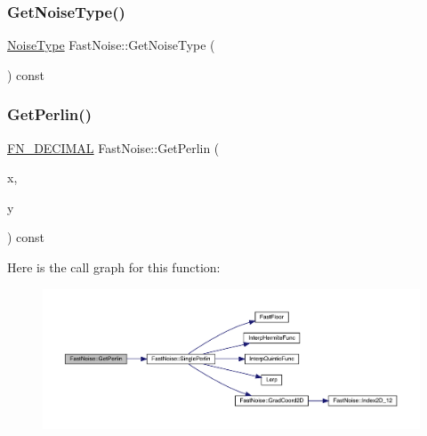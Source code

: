 \subsubsection{\texorpdfstring{Get\+Noise\+Type()}{GetNoiseType()}}
{\footnotesize\ttfamily \mbox{\hyperlink{class_fast_noise_a77adcfdc4d6e9410ef6099553509d09f}{Noise\+Type}} Fast\+Noise\+::\+Get\+Noise\+Type (\begin{DoxyParamCaption}{ }\end{DoxyParamCaption}) const\hspace{0.3cm}{\ttfamily [inline]}}

\mbox{\label{class_fast_noise_aa511d58e188f47cf4fd7fa83164e7a0b}} 
\subsubsection{\texorpdfstring{Get\+Perlin()}{GetPerlin()}\hspace{0.1cm}{\footnotesize\ttfamily [1/2]}}
{\footnotesize\ttfamily \mbox{\hyperlink{_fast_noise_8h_a75a9ef6d2541c4921815b885bfd449c3}{F\+N\+\_\+\+D\+E\+C\+I\+M\+AL}} Fast\+Noise\+::\+Get\+Perlin (\begin{DoxyParamCaption}\item[{\mbox{\hyperlink{_fast_noise_8h_a75a9ef6d2541c4921815b885bfd449c3}{F\+N\+\_\+\+D\+E\+C\+I\+M\+AL}}}]{x,  }\item[{\mbox{\hyperlink{_fast_noise_8h_a75a9ef6d2541c4921815b885bfd449c3}{F\+N\+\_\+\+D\+E\+C\+I\+M\+AL}}}]{y }\end{DoxyParamCaption}) const}

Here is the call graph for this function\+:
\nopagebreak
\begin{figure}[H]
\begin{center}
\leavevmode
\includegraphics[width=350pt]{d1/dd8/class_fast_noise_aa511d58e188f47cf4fd7fa83164e7a0b_cgraph}
\end{center}
\end{figure}
\mbox{\label{class_fast_noise_ac8379b662e050faf5302026616fc56af}} 
